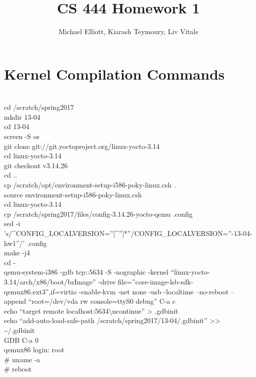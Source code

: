 \documentclass[letterpaper,10pt,titlepage,draftclsnofoot,onecolumn]{IEEEtran}
\title{CS 444 Homework 1}
\author{Michael Elliott, Kiarash Teymoury, Liv Vitale}
\begin{document}
\begin{titlingpage}
\maketitle
\end{titlingpage}

\section{Kernel Compilation Commands}
\\\textdollar{} cd /scratch/spring2017
\\\textdollar{} mkdir 13-04
\\\textdollar{} cd 13-04
\\\textdollar{} screen -S os
\\\textdollar{} git clone git://git.yoctoproject.org/linux-yocto-3.14
\\\textdollar{} cd linux-yocto-3.14
\\\textdollar{} git checkout v3.14.26
\\\textdollar{} cd ..
\\\textdollar{} cp /scratch/opt/environment-setup-i586-poky-linux.csh .
\\\textdollar{} source environment-setup-i586-poky-linux.csh
\\\textdollar{} cd linux-yocto-3.14
\\\textdollar{} cp /scratch/spring2017/files/config-3.14.26-yocto-qemu .config
\\\textdollar{} sed -i 's/\^{}CONFIG\_LOCALVERSION=''[\^{}'']*''\textdollar{}/CONFIG\_LOCALVERSION=''-13-04-hw1''/' .config
\\\textdollar{} make -j4
\\\textdollar{} cd -
\\\textdollar{} qemu-system-i386 -gdb tcp::5634 -S -nographic -kernel ``linux-yocto-3.14/arch/x86/boot/bzImage'' -drive file=''core-image-lsb-sdk-qemux86.ext3'',if=virtio -enable-kvm -net none -usb -localtime --no-reboot --append ``root=/dev/vda rw console=ttyS0 debug''
C-a c
\\\textdollar{} echo ``target remote localhost:5634\textbackslash{}ncontinue'' \textgreater{} .gdbinit
\\\textdollar{} echo ``add-auto-load-safe-path /scratch/spring2017/13-04/.gdbinit'' \textgreater{}\textgreater{} \textasciitilde{}/.gdbinit
\\\textdollar{} \textdollar{}GDB
C-a 0
\\qemux86 login: root
\\\# uname -a
\\\# reboot
\end{document}
